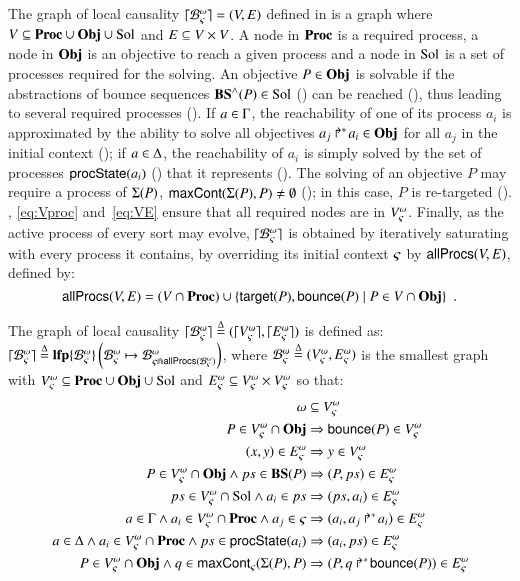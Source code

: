 The graph of local causality $\lceil \mathcal{B}_\varsigma^\omega\rceil = (V, E)$ defined in  is a graph where $V \subseteq \mathbf{Proc} \cup \mathbf{Obj} \cup \mathrm{Sol}$ and $E \subseteq V \times V$.
A node in $\mathbf{Proc}$ is a required process,
a node in $\mathbf{Obj}$ is an objective to reach a given process
and a node in $\mathrm{Sol}$ is a set of processes required for the solving.
An objective $P \in \mathbf{Obj}$ is solvable if the abstractions of bounce sequences $\mathbf{BS}^\wedge(P) \in \mathrm{Sol}$ () can be reached (), thus leading to several required processes ().
If $a \in \Gamma$, the reachability of one of its process $a_i$ is approximated by the ability to solve all objectives $\mbox{${a}_{j}\Rsh^*\!{a}_{i}$} \in \mathbf{Obj}$ for all $a_j$ in the initial context ();
if $a \in \Delta$, the reachability of $a_i$ is simply solved by the set of processes $\mathsf{procState}(a_i)$ () that it represents ().
The solving of an objective $P$ may require a process of $\Sigma(P)$, \ie $\mathsf{maxCont}(\Sigma(P), P) \neq \emptyset$ (); in this case, $P$ is re-targeted ().
, \eqref{eq:Vproc} and~\eqref{eq:VE} ensure that all required nodes are in $V_\varsigma^\omega$.
Finally, as the active process of every sort may evolve, $\lceil \mathcal{B}_\varsigma^\omega\rceil$ is obtained by iteratively saturating with every process it contains,
\ie by overriding its initial context $\varsigma$ by $\mathsf{allProcs}(V, E)$, defined by:
\[\mathsf{allProcs}(V, E) = (V \cap \mathbf{Proc}) \cup \{ \mathsf{target}(P), \mathsf{bounce}(P) \mid P \in V \cap \mathbf{Obj} \} \enspace.\]

\begin{definition}
\label{def:glc}
  The graph of local causality $\lceil \mathcal{B}_\varsigma^\omega\rceil \stackrel{\Delta}= (\lceil V_\varsigma^\omega\rceil, \lceil E_\varsigma^\omega\rceil)$ is defined as: $\lceil \mathcal{B}_\varsigma^\omega\rceil \stackrel{\Delta}= \mathbf{lfp}\{\mathcal{B}^\omega_\varsigma\}\left(\mathcal{B}^\omega_\varsigma\mapsto\mathcal{B}^\omega_{\varsigma \Cap \mathsf{allProcs}(\mathcal{B}^\omega_\varsigma)}\right)$,
  where $\mathcal{B}^\omega_\varsigma \stackrel{\Delta}= (V_\varsigma^\omega, E_\varsigma^\omega)$ is the smallest graph with
  $V_\varsigma^\omega \subseteq \mathbf{Proc} \cup \mathbf{Obj} \cup \mathrm{Sol}$ and $E_\varsigma^\omega \subseteq V_\varsigma^\omega \times V_\varsigma^\omega$
  so that:
  \begin{align}
    \omega &\subseteq V_\varsigma^\omega \label{eq:Vw} \\
    P \in V_\varsigma^\omega \cap \mathbf{Obj} &\Rightarrow \mathsf{bounce}(P) \in V_\varsigma^\omega \label{eq:Vproc} \\
    (x, y) \in E_\varsigma^\omega &\Rightarrow y \in V_\varsigma^\omega \label{eq:VE} \\
    P \in V_\varsigma^\omega \cap \mathbf{Obj} \wedge ps \in \mathbf{BS}(P) &\Rightarrow (P, ps) \in E_\varsigma^\omega \label{eq:ESol1} \\
    ps \in V_\varsigma^\omega \cap \mathrm{Sol} \wedge a_i \in ps &\Rightarrow (ps, a_i) \in E_\varsigma^\omega \label{eq:ESol2} \\
    a \in \Gamma \wedge a_i \in V_\varsigma^\omega \cap \mathbf{Proc} \wedge a_j \in \varsigma &\Rightarrow (a_i, \mbox{${a}_{j}\Rsh^*\!{a}_{i}$}) \in E_\varsigma^\omega \label{eq:EReq} \\
    a \in \Delta \wedge a_i \in V_\varsigma^\omega \cap \mathbf{Proc} \wedge ps \in \mathsf{procState}(a_i) &\Rightarrow (a_i, ps) \in E_\varsigma^\omega \label{eq:EPrio} \\
    P \in V_\varsigma^\omega \cap \mathbf{Obj} \wedge q \in \mathsf{maxCont}_\varsigma(\Sigma(P), P) &\Rightarrow (P, \mbox{$q\Rsh^*\!\mathsf{bounce}(P)$}) \in E_\varsigma^\omega \label{eq:ECont} \!
  \end{align}
\end{definition}

